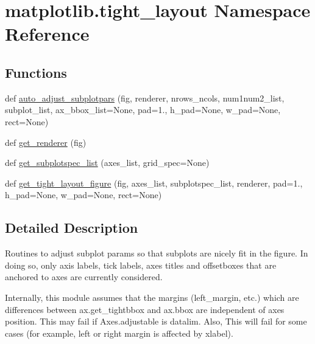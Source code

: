 \hypertarget{namespacematplotlib_1_1tight__layout}{}\section{matplotlib.\+tight\+\_\+layout Namespace Reference}
\label{namespacematplotlib_1_1tight__layout}
\subsection*{Functions}
\begin{DoxyCompactItemize}
\item 
def \hyperlink{namespacematplotlib_1_1tight__layout_aac0a3ed65fdbe116ec3c52a261a0d0da}{auto\+\_\+adjust\+\_\+subplotpars} (fig, renderer, nrows\+\_\+ncols, num1num2\+\_\+list, subplot\+\_\+list, ax\+\_\+bbox\+\_\+list=None, pad=1., h\+\_\+pad=None, w\+\_\+pad=None, rect=None)
\item 
def \hyperlink{namespacematplotlib_1_1tight__layout_a76e234291b6f43abf23322624f19cd6f}{get\+\_\+renderer} (fig)
\item 
def \hyperlink{namespacematplotlib_1_1tight__layout_ad7e4bbde66af2565e3d7f870913c87f8}{get\+\_\+subplotspec\+\_\+list} (axes\+\_\+list, grid\+\_\+spec=None)
\item 
def \hyperlink{namespacematplotlib_1_1tight__layout_acfa6d3d8d24026f694a08798f67f6561}{get\+\_\+tight\+\_\+layout\+\_\+figure} (fig, axes\+\_\+list, subplotspec\+\_\+list, renderer, pad=1., h\+\_\+pad=None, w\+\_\+pad=None, rect=None)
\end{DoxyCompactItemize}


\subsection{Detailed Description}
\begin{DoxyVerb}Routines to adjust subplot params so that subplots are
nicely fit in the figure. In doing so, only axis labels, tick labels, axes
titles and offsetboxes that are anchored to axes are currently considered.

Internally, this module assumes that the margins (left_margin, etc.) which are
differences between ax.get_tightbbox and ax.bbox are independent of axes
position. This may fail if Axes.adjustable is datalim. Also, This will fail
for some cases (for example, left or right margin is affected by xlabel).
\end{DoxyVerb}
 


